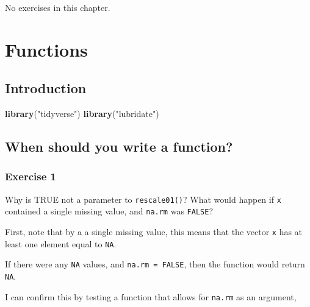 \documentclass[]{book}
\newenvironment{Shaded}{\begin{snugshade}}{\end{snugshade}}
\newcommand{\KeywordTok}[1]{\textcolor[rgb]{0.13,0.29,0.53}{\textbf{#1}}}
\newcommand{\NormalTok}[1]{#1}
\newcommand{\StringTok}[1]{\textcolor[rgb]{0.31,0.60,0.02}{#1}}
\theoremstyle{plain}
\theoremstyle{remark}
\theoremstyle{definition}
\theoremstyle{definition}
\theoremstyle{definition}
\theoremstyle{remark}
\begin{document}
No exercises in this chapter.

\hypertarget{functions}{%
\chapter{Functions}\label{functions}}

\hypertarget{introduction-12}{%
\section{Introduction}\label{introduction-12}}

\begin{Shaded}
\begin{Highlighting}[]
\KeywordTok{library}\NormalTok{(}\StringTok{"tidyverse"}\NormalTok{)}
\KeywordTok{library}\NormalTok{(}\StringTok{"lubridate"}\NormalTok{)}
\end{Highlighting}
\end{Shaded}

\hypertarget{when-should-you-write-a-function}{%
\section{When should you write a
function?}\label{when-should-you-write-a-function}}

\hypertarget{exercise-1-49}{%
\subsection{Exercise 1}\label{exercise-1-49}}

Why is TRUE not a parameter to \texttt{rescale01()}? What would happen
if \texttt{x} contained a single missing value, and \texttt{na.rm} was
\texttt{FALSE}?

First, note that by a a single missing value, this means that the vector
\texttt{x} has at least one element equal to \texttt{NA}.

If there were any \texttt{NA} values, and \texttt{na.rm\ =\ FALSE}, then
the function would return \texttt{NA}.

I can confirm this by testing a function that allows for \texttt{na.rm}
as an argument,
\end{document}
